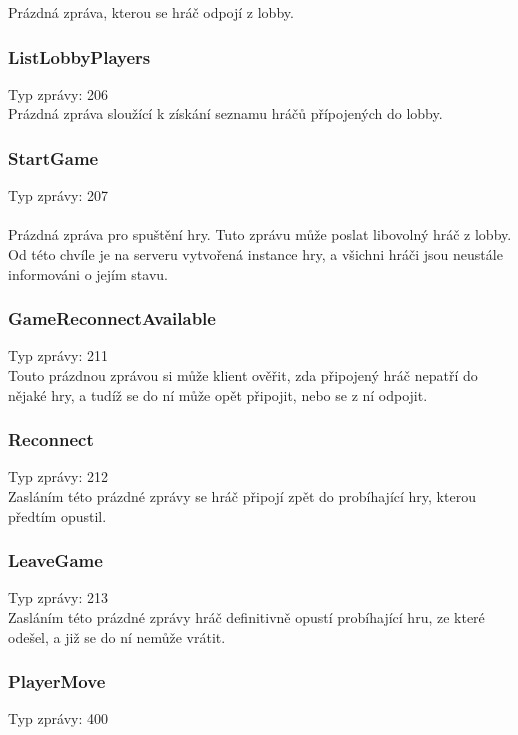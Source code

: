 \documentclass[12pt, a4paper]{article}
\begin{document}
    Prázdná zpráva, kterou se hráč odpojí z lobby.

    \subsubsection*{ListLobbyPlayers}
    Typ zprávy: 206\\

    Prázdná zpráva sloužící k získání seznamu hráčů přípojených do lobby.

    \subsubsection*{StartGame}
    Typ zprávy: 207\\\\
    Prázdná zpráva pro spuštění hry.
    Tuto zprávu může poslat libovolný hráč z lobby.
    Od této chvíle je na serveru vytvořená instance hry, a všichni hráči jsou neustále informováni o jejím stavu.

    \subsubsection*{GameReconnectAvailable}
    Typ zprávy: 211\\

    Touto prázdnou zprávou si může klient ověřit, zda připojený hráč nepatří do nějaké hry, a tudíž se do ní může opět připojit, nebo se z ní odpojit.

    \subsubsection*{Reconnect}
    Typ zprávy: 212\\

    Zasláním této prázdné zprávy se hráč připojí zpět do probíhající hry, kterou předtím opustil.

    \subsubsection*{LeaveGame}
    Typ zprávy: 213\\

    Zasláním této prázdné zprávy hráč definitivně opustí probíhající hru, ze které odešel, a již se do ní nemůže vrátit.
   
    \subsubsection*{PlayerMove}
    Typ zprávy: 400\\
\end{document}

